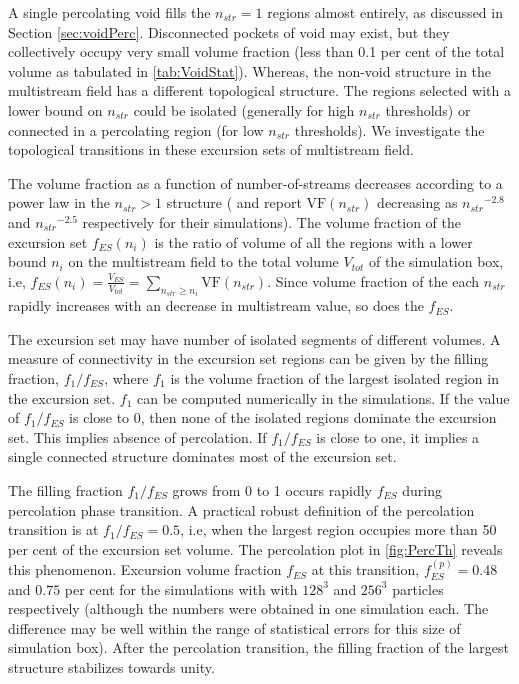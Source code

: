 A single percolating void fills the $n_{str} = 1$ regions almost entirely, as discussed in Section \ref{sec:voidPerc}. Disconnected pockets of void may exist, but they collectively occupy very small volume fraction (less than 0.1 per cent of the total volume as tabulated in \autoref{tab:VoidStat}). Whereas, the non-void structure in the multistream field has a different topological structure. The regions selected with a lower bound on $n_{str}$ could be isolated (generally for high $n_{str}$ thresholds) or connected in a percolating region (for low $n_{str}$ thresholds). We investigate the topological transitions in these excursion sets of multistream field. 



The volume fraction as a function of number-of-streams decreases according to a power law in the $n_{str} > 1$ structure (\citealt{Shandarin2012} and \citealt{Ramachandra2015} report $\text{VF}(n_{str})$ decreasing as ${n_{str}}^{-2.8} $ and  ${n_{str}}^{-2.5}$ respectively for their simulations). The volume fraction of the excursion set $f_{ES}(n_i)$ is the ratio of volume of all the regions with a lower bound $n_i$ on the multistream field to the total volume $V_{tot}$ of the simulation box, i.e, $ \displaystyle f_{ES}(n_i) = \frac{V_{ES}}{V_{tot}} =  {\sum\limits_{n_{str} \geq n_i} \text{VF} ({n_{str}})}$. Since volume fraction of the each $n_{str}$ rapidly increases with an decrease in multistream value, so does the $f_{ES}$. 


The excursion set may have number of isolated segments of different volumes. A measure of connectivity in the excursion set regions can be given by the filling fraction, $f_1/f_{ES}$, where $f_1$ is the volume fraction of the largest isolated region in the excursion set. $f_1$ can be computed numerically in the simulations. If the value of $f_1/f_{ES}$ is close to 0, then none of the isolated regions dominate the excursion set. This implies absence of percolation. If $f_1/f_{ES}$ is close to one, it implies a single connected structure dominates most of the excursion set. 


The filling fraction $f_1/f_{ES}$ grows from 0 to 1 occurs rapidly $f_{ES}$ during percolation phase transition. A practical robust definition of the percolation transition is at $f_1/f_{ES} = 0.5$, i.e, when the  largest region occupies more than 50 per cent of the excursion set volume. The percolation plot in \autoref{fig:PercTh} reveals this phenomenon. Excursion volume fraction $f_{ES}$ at this transition, $f_{ES}^{(p)} = 0.48$ and $0.75$ per cent for the simulations with with $128^3$ and $256^3$ particles respectively (although the numbers were obtained in one simulation each. The difference may be well within the range of statistical errors for this size of simulation box). After the percolation transition, the filling fraction of the largest structure stabilizes towards unity. 


